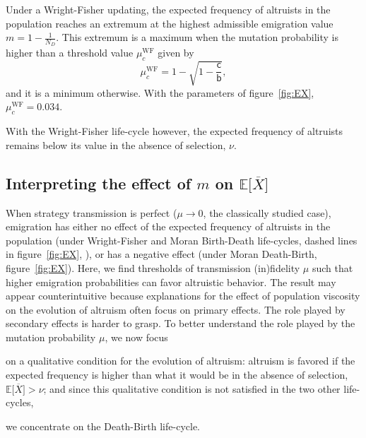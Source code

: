 \documentclass[11pt, letterpaper]{article}
\newcommand{\Esp}[1]{\mathbb{E}\big[ #1\big]}%
\newcommand{\bb}{\mathsf{b}}
\newcommand{\cc}{\mathsf{c}}
\newcommand{\WF}{\textrm{WF}}
\newcommand{\mutbias}{\nu}
\newcommand{\ndemes}{N_D}
\begin{document}
Under a Wright-Fisher updating, the expected frequency of altruists in the population reaches an extremum at the highest admissible emigration value $m = 1-\frac{1}{\ndemes}$. This extremum is a maximum when the mutation probability is higher than a threshold value $\mu_c^{\WF}$ given by 
\begin{equation}
\mu_c^{\WF} = 1-\sqrt{1-\frac{\cc}{\bb}},
\end{equation}
and it is a minimum otherwise. With the parameters of figure~\ref{fig:EX}, $\mu_c^{\WF} = 0.034$. 

With the Wright-Fisher life-cycle however, the expected frequency of altruists remains below its value in the absence of selection, $\mutbias$. 



\subsection*{Interpreting the effect of $m$ on $\Esp{\overline{X}}$}

When strategy transmission is perfect ($\mu\to 0$, the classically studied case), emigration has either no effect of the expected frequency of altruists in the population (under Wright-Fisher and Moran Birth-Death life-cycles, dashed lines in figure~\ref{fig:EX}, ), or has a negative effect (under Moran Death-Birth, figure~\ref{fig:EX}). Here, we find thresholds of transmission (in)fidelity $\mu$ such that higher emigration probabilities can favor altruistic behavior. The result may appear counterintuitive because explanations for the effect of population viscosity on the evolution of altruism often focus on primary effects. The role played by secondary effects is harder to grasp. To better understand the role played by the mutation probability $\mu$, we now focus \begin{inparaenum}[\it i\rm )] \item on a qualitative condition for the evolution of altruism: altruism is favored if the expected frequency is higher than what it would be in the absence of selection, $\Esp{\overline{X}} > \mutbias$; and since this qualitative condition is not satisfied in the two other life-cycles, \item we concentrate on the Death-Birth life-cycle.
\end{inparaenum}
%
\end{document}
